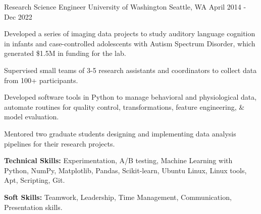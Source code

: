 

\begin{cventries}

  \cventry
  {Research Science Engineer} %
  {University of Washington} %
  {Seattle, WA} %
  {April 2014 - Dec 2022} %
  {
    \begin{cvitems} %
      \item {Developed a series of imaging data projects to study auditory language cognition in infants and case-controlled adolescents with Autism Spectrum Disorder, which generated \$1.5M in funding for the lab.}
      \item {Supervised small teams of 3-5 research assistants and coordinators to collect data from 100+ participants.} %
      \item {Developed software tools in Python to manage behavioral and physiological data, automate routines for quality control, transformations, feature engineering, \& model evaluation.}
      \item {Mentored two graduate students designing and implementing data analysis pipelines for their research projects.}
      \item {\textbf{Technical Skills:} Experimentation, A/B testing, Machine Learning with Python, NumPy, Matplotlib, Pandas, Scikit-learn, Ubuntu Linux, Linux tools, Apt, Scripting, Git.}
      \item {\textbf{Soft Skills:} Teamwork, Leadership, Time Management, Communication, Presentation skills.}
    \end{cvitems}
  }


\end{cventries}
